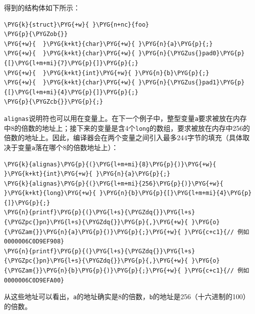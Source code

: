 
得到的结构体如下所示：



\begin{codeblockbg}
\begin{Verbatim}[commandchars=\\\{\},breaklines=true,breakanywhere=true,fontsize=\codefont,xleftmargin=17bp]
\PYG{k}{struct}\PYG{+w}{ }\PYG{n+nc}{foo}
\PYG{p}{\PYGZob{}}
\PYG{+w}{  }\PYG{k+kt}{char}\PYG{+w}{ }\PYG{n}{a}\PYG{p}{;}
\PYG{+w}{  }\PYG{k+kt}{char}\PYG{+w}{ }\PYG{n}{\PYGZus{}pad0}\PYG{p}{[}\PYG{l+m+mi}{7}\PYG{p}{]}\PYG{p}{;}
\PYG{+w}{  }\PYG{k+kt}{int}\PYG{+w}{ }\PYG{n}{b}\PYG{p}{;}
\PYG{+w}{  }\PYG{k+kt}{char}\PYG{+w}{ }\PYG{n}{\PYGZus{}pad1}\PYG{p}{[}\PYG{l+m+mi}{4}\PYG{p}{]}\PYG{p}{;}
\PYG{p}{\PYGZcb{}}\PYG{p}{;}
\end{Verbatim}
\end{codeblockbg}



\texttt{alignas}说明符也可以用在变量上。在下一个例子中，整型变量\texttt{a}要求被放在内存中8的倍数的地址上；接下来的变量是含4个\texttt{long}的数组，要求被放在内存中256的倍数的地址上。因此，编译器会在两个变量之间引入最多244字节的填充（具体取决于变量\texttt{a}落在哪个8的倍数地址上）：



\begin{codeblockbg}
\begin{Verbatim}[commandchars=\\\{\},breaklines=true,breakanywhere=true,fontsize=\codefont,xleftmargin=17bp]
\PYG{k}{alignas}\PYG{p}{(}\PYG{l+m+mi}{8}\PYG{p}{)}\PYG{+w}{   }\PYG{k+kt}{int}\PYG{+w}{ }\PYG{n}{a}\PYG{p}{;}
\PYG{k}{alignas}\PYG{p}{(}\PYG{l+m+mi}{256}\PYG{p}{)}\PYG{+w}{ }\PYG{k+kt}{long}\PYG{+w}{ }\PYG{n}{b}\PYG{p}{[}\PYG{l+m+mi}{4}\PYG{p}{]}\PYG{p}{;}
\PYG{n}{printf}\PYG{p}{(}\PYG{l+s}{\PYGZdq{}}\PYG{l+s}{\PYGZpc{}pn}\PYG{l+s}{\PYGZdq{}}\PYG{p}{,}\PYG{+w}{ }\PYG{o}{\PYGZam{}}\PYG{n}{a}\PYG{p}{)}\PYG{p}{;}\PYG{+w}{ }\PYG{c+c1}{// 例如 0000006C0D9EF908}
\PYG{n}{printf}\PYG{p}{(}\PYG{l+s}{\PYGZdq{}}\PYG{l+s}{\PYGZpc{}pn}\PYG{l+s}{\PYGZdq{}}\PYG{p}{,}\PYG{+w}{ }\PYG{o}{\PYGZam{}}\PYG{n}{b}\PYG{p}{)}\PYG{p}{;}\PYG{+w}{ }\PYG{c+c1}{// 例如 0000006C0D9EFA00}
\end{Verbatim}
\end{codeblockbg}



从这些地址可以看出，\texttt{a}的地址确实是8的倍数，\texttt{b}的地址是256（十六进制的100）的倍数。


